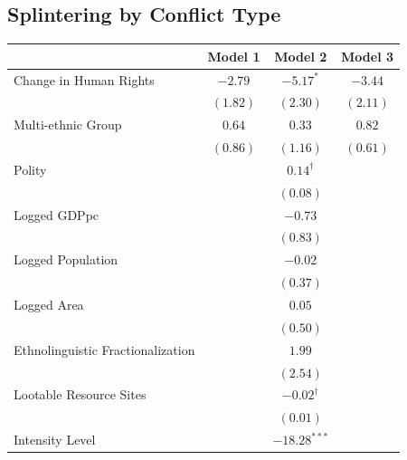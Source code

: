 \documentclass[12pt,]{book}
\let\origtable\table
\let\endorigtable\endtable
\renewenvironment{table}[1][2] {
    \singlespacing
    \expandafter\origtable\expandafter[H]
} {
    \endorigtable
}
\theoremstyle{definition}
\theoremstyle{definition}
\theoremstyle{definition}
\theoremstyle{remark}
\begin{document}
\hypertarget{splintering-by-conflict-type}{%
\subsection*{Splintering by Conflict
Type}\label{splintering-by-conflict-type}}

\begin{table}
\begin{center}
\begin{tabular}{l c c c }
\hline
 & Model 1 & Model 2 & Model 3 \\
\hline
Change in Human Rights            & $-2.79$  & $-5.17^{*}$       & $-3.44$  \\
                                  & $(1.82)$ & $(2.30)$          & $(2.11)$ \\
Multi-ethnic Group                & $0.64$   & $0.33$            & $0.82$   \\
                                  & $(0.86)$ & $(1.16)$          & $(0.61)$ \\
Polity                            &          & $0.14^{\dagger}$  &          \\
                                  &          & $(0.08)$          &          \\
Logged GDPpc                      &          & $-0.73$           &          \\
                                  &          & $(0.83)$          &          \\
Logged Population                 &          & $-0.02$           &          \\
                                  &          & $(0.37)$          &          \\
Logged Area                       &          & $0.05$            &          \\
                                  &          & $(0.50)$          &          \\
Ethnolinguistic Fractionalization &          & $1.99$            &          \\
                                  &          & $(2.54)$          &          \\
Lootable Resource Sites           &          & $-0.02^{\dagger}$ &          \\
                                  &          & $(0.01)$          &          \\
Intensity Level                   &          & $-18.28^{***}$    &          \\

\end{tabular}
\end{center}
\end{table}
\end{document}
